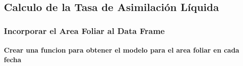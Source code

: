 \documentclass[
]{article}
\begin{document}
\hypertarget{calculo-de-la-tasa-de-asimilaciuxf3n-luxedquida}{%
\subsection{Calculo de la Tasa de Asimilación
Líquida}\label{calculo-de-la-tasa-de-asimilaciuxf3n-luxedquida}}

\hypertarget{incorporar-el-area-foliar-al-data-frame}{%
\subsubsection{Incorporar el Area Foliar al Data
Frame}\label{incorporar-el-area-foliar-al-data-frame}}

\hypertarget{crear-una-funcion-para-obtener-el-modelo-para-el-area-foliar-en-cada-fecha}{%
\paragraph{Crear una funcion para obtener el modelo para el area foliar
en cada
fecha}\label{crear-una-funcion-para-obtener-el-modelo-para-el-area-foliar-en-cada-fecha}}
\end{document}
